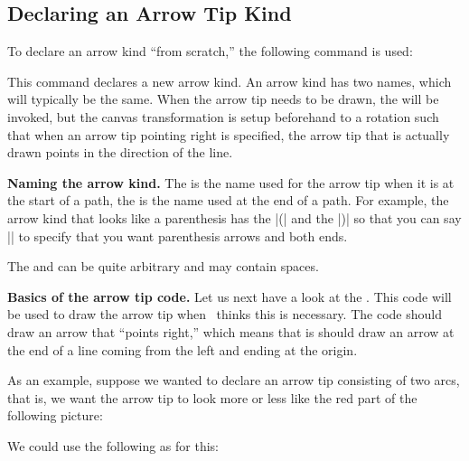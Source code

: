 \subsection{Declaring an Arrow Tip Kind}

To declare an arrow kind ``from scratch,'' the following command is
used:

\begin{command}{\pgfarrowsdeclare{}}
  This command declares a new arrow kind. An arrow kind has two names,
  which will typically be the same. When the arrow tip needs to be
  drawn, the  will be invoked, but the canvas
  transformation is setup beforehand to a rotation such that when an
  arrow tip pointing right is specified, the arrow tip that is
  actually drawn points in the direction of the line.

  \medskip
  \textbf{Naming the arrow kind.}
  The  is the name
  used for the arrow tip when it is at the start of a path, the  is the name used at the end of a path. For example, the
  arrow kind that looks like a parenthesis has the  |(| and the  |)| so that you can say
  |\pgfsetarrows{(-)}| to specify that you want parenthesis arrows and
  both ends.

  The  and  can be quite arbitrary and
  may contain spaces.

  \medskip
  \textbf{Basics of the arrow tip code.}
  Let us next have a look at the . This code will
  be used to draw the arrow tip when \pgfname\ thinks this is
  necessary. The code should draw an arrow that ``points right,''
  which means that is should draw an arrow at the end of a line coming
  from the left and ending at the origin.

  As an example, suppose we wanted to declare an arrow tip consisting
  of two arcs, that is, we want the arrow tip to look more or less
  like the red part of the following picture:
\begin{codeexample}[]
\end{codeexample}

  We could use the following as  for this:
\begin{codeexample}
{
  \pgfsetdash{}{0pt} %
  \pgfsetroundjoin   %
  \pgfsetroundcap    %
  \pgfpathmoveto{\pgfpoint{-10pt}{10pt}}
  \pgfusepathqstroke
}
\end{codeexample}


\end{command}
